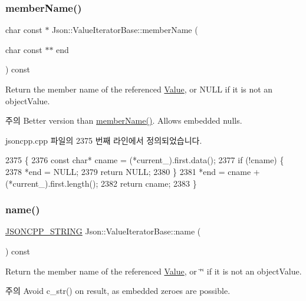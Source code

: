 \subsubsection{\texorpdfstring{member\+Name()}{memberName()}\hspace{0.1cm}{\footnotesize\ttfamily [2/2]}}
{\footnotesize\ttfamily char const  $\ast$ Json\+::\+Value\+Iterator\+Base\+::member\+Name (\begin{DoxyParamCaption}\item[{char const $\ast$$\ast$}]{end }\end{DoxyParamCaption}) const}

Return the member name of the referenced \hyperlink{class_json_1_1_value}{Value}, or N\+U\+LL if it is not an object\+Value. \begin{DoxyNote}{주의}
Better version than \hyperlink{class_json_1_1_value_iterator_base_a54765da6759fd3f1edcbfbaf308ec263}{member\+Name()}. Allows embedded nulls. 
\end{DoxyNote}


jsoncpp.\+cpp 파일의 2375 번째 라인에서 정의되었습니다.


\begin{DoxyCode}
2375                                                                 \{
2376   \textcolor{keyword}{const} \textcolor{keywordtype}{char}* cname = (*current\_).first.data();
2377   \textcolor{keywordflow}{if} (!cname) \{
2378     *end = NULL;
2379     \textcolor{keywordflow}{return} NULL;
2380   \}
2381   *end = cname + (*current\_).first.length();
2382   \textcolor{keywordflow}{return} cname;
2383 \}
\end{DoxyCode}
\mbox{\label{class_json_1_1_value_iterator_base_a522989403c976fdbb94da846b99418db}} 
\subsubsection{\texorpdfstring{name()}{name()}}
{\footnotesize\ttfamily \hyperlink{json_8h_a1e723f95759de062585bc4a8fd3fa4be}{J\+S\+O\+N\+C\+P\+P\+\_\+\+S\+T\+R\+I\+NG} Json\+::\+Value\+Iterator\+Base\+::name (\begin{DoxyParamCaption}{ }\end{DoxyParamCaption}) const}

Return the member name of the referenced \hyperlink{class_json_1_1_value}{Value}, or \char`\"{}\char`\"{} if it is not an object\+Value. \begin{DoxyNote}{주의}
Avoid {\ttfamily c\+\_\+str()} on result, as embedded zeroes are possible. 
\end{DoxyNote}



